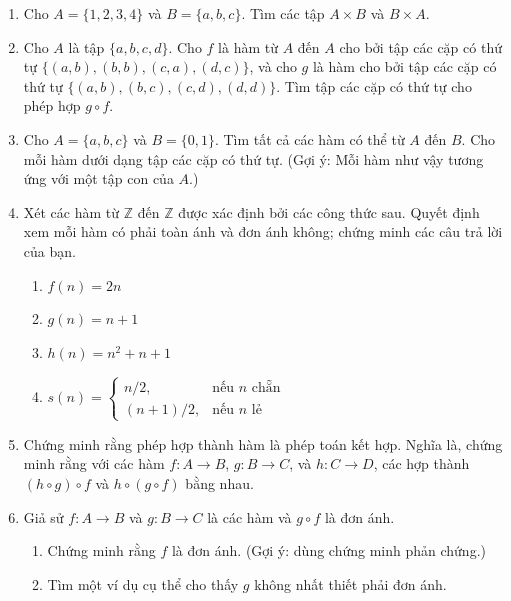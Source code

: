 \begin{enumerate}
\item[\dag 1.] Cho $A = \{1,2,3,4\}$ và $B = \{a,b,c\}$. Tìm các tập $A \times B$ và $B \times A$.

\item[\dag 2.] Cho $A$ là tập $\{a,b,c,d\}$. Cho $f$ là hàm từ $A$ đến $A$ cho bởi tập các cặp có thứ tự $\{(a,b),(b,b),(c,a),(d,c)\}$, và cho $g$ là hàm cho bởi tập các cặp có thứ tự $\{(a,b),(b,c),(c,d),(d,d)\}$. Tìm tập các cặp có thứ tự cho phép hợp $g \circ f$.

\item[\dag 3.] Cho $A = \{a,b,c\}$ và $B = \{0,1\}$. Tìm tất cả các hàm có thể từ $A$ đến $B$. Cho mỗi hàm dưới dạng tập các cặp có thứ tự. (Gợi ý: Mỗi hàm như vậy tương ứng với một tập con của $A$.)

\item[\dag 4.] Xét các hàm từ $\mathbb{Z}$ đến $\mathbb{Z}$ được xác định bởi các công thức sau. Quyết định xem mỗi hàm có phải toàn ánh và đơn ánh không; chứng minh các câu trả lời của bạn.

\begin{enumerate}[label=\alph*)]
\item $f(n) = 2n$
\item $g(n) = n + 1$
\item $h(n) = n^2 + n + 1$
\item $s(n) = \begin{cases} n/2, & \text{nếu } n \text{ chẵn} \\ (n+1)/2, & \text{nếu } n \text{ lẻ} \end{cases}$
\end{enumerate}

\item[\dag 5.] Chứng minh rằng phép hợp thành hàm là phép toán kết hợp. Nghĩa là, chứng minh rằng với các hàm $f\colon A \to B$, $g\colon B \to C$, và $h\colon C \to D$, các hợp thành $(h \circ g) \circ f$ và $h \circ (g \circ f)$ bằng nhau.

\item[\dag 6.] Giả sử $f\colon A \to B$ và $g\colon B \to C$ là các hàm và $g \circ f$ là đơn ánh.
\begin{enumerate}[label=\alph*)]
\item Chứng minh rằng $f$ là đơn ánh. (Gợi ý: dùng chứng minh phản chứng.)
\item Tìm một ví dụ cụ thể cho thấy $g$ không nhất thiết phải đơn ánh.
\end{enumerate}


\end{enumerate}
